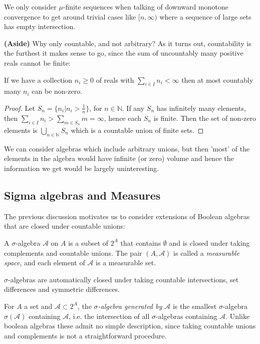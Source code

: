 \documentclass[9pt]{report}
\newlength{\tindent}
\newtheorem[L]{theorem}{Theorem}[chapter]
\newtheorem[L,nocut]{definition}[theorem]{Definition}
\newtheorem[S,nounderline]{remark}[theorem]{Remarks}
\newenvironment{Proof}{ 
	\\ \setlength{\parindent}{\tindent}
\begin{proof}}
{\end{proof} \setlength{\parindent}{0pt}}
\begin{document}
\begin{remark}
	We only consider \(\mu\)-finite sequences when talking of downward monotone convergence to get around trivial cases like \([n,\infty)\) where a sequence of large sets has empty intersection.
\end{remark}

\textbf{(Aside)} Why only countable, and not arbitrary?	As it turns out, countability is the furthest it makes sense to go, since the sum of uncountably many positive reals cannot be finite:

\begin{theorem}
	If we have a collection \(n_i \geq 0\) of reals with \(\sum_{i \in I}n_i < \infty\) then at most countably many \(n_i\) can be non-zero.
	\begin{Proof}
		Let \(S_n = \{n_i | n_i > \frac{1}{n}\}\), for \(n \in \mathbb{N}\). If any \(S_n\) has infinitely many elements, then \(\sum_{i \in I}n_i > \sum_{m \in S_n} m= \infty\), hence each \(S_n\) is finite. Then the set of non-zero elements is \(\bigcup_{n\in \mathbb{N}}S_n\) which is a countable union of finite sets.
	\end{Proof}
\end{theorem}

We can consider algebras which include arbitrary unions, but then 'most' of the elements in the algebra would have infinite (or zero) volume and hence the information we get would be largely uninteresting. 

\subsection{Sigma algebras and Measures}

The previous discussion motivates us to consider extensions of Boolean algebras that are closed under countable unions:

\begin{definition}
A \(\sigma\)-algebra \(\mathcal{A}\) on \(A\) is a subset of \(2^A\) that contains \(\emptyset\) and is closed under taking complements and countable unions. The pair \((A,\mathcal{A})\) is called a \emph{measurable space}, and each element of \(\mathcal{A}\) is a measurable set.
\end{definition}

\(\sigma\)-algebras are automatically closed under taking countable intersections, set differences and symmetric differences.

For \(A\) a set and \(\mathcal{A}\subset 2^A\), the \emph{\(\sigma\)-algebra generated by \(\mathcal{A}\)} is the smallest \(\sigma\)-algebra \(\sigma(\mathcal{A})\) containing \(\mathcal{A}\), i.e. the intersection of all \(\sigma\)-algebras containing \(\mathcal{A}\). Unlike boolean algebras these admit no simple description, since taking countable unions and complements is not a straightforward procedure.
\end{document}
